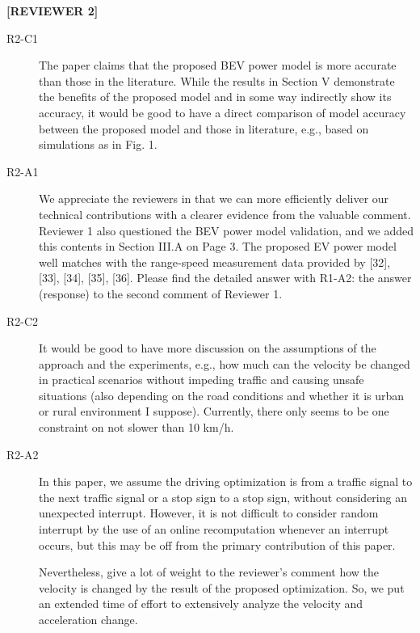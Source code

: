 \documentclass[onecolumn]{IEEEconf}
\begin{document}
\textbf{[REVIEWER 2]}
\begin{description}

\item [R2-C1] The paper claims that the proposed BEV power model is more accurate than those in the literature. While the results in Section V demonstrate the benefits of the proposed model and in some way indirectly show its accuracy, it would be good to have a direct comparison of model accuracy between the proposed model and those in literature, e.g., based on simulations as in Fig. 1. 

\item [R2-A1] We appreciate the reviewers in that we can more efficiently deliver our technical contributions with a clearer evidence from the valuable comment. Reviewer 1 also questioned the BEV power model validation, and we added this contents in Section III.A on Page 3. The proposed EV power model well matches with the range-speed measurement  data provided by [32], [33], [34], [35], [36]. Please find the detailed answer with R1-A2: the answer (response) to the second comment of Reviewer 1.

\item [R2-C2] It would be good to have more discussion on the assumptions of the approach and the experiments, e.g., how much can the velocity be changed in practical scenarios without impeding traffic and causing unsafe situations (also depending on the road conditions and whether it is urban or rural environment I suppose). Currently, there only seems to be one constraint on not slower than 10 km/h. 

\item [R2-A2] In this paper, we assume the driving optimization is from a traffic signal to the next traffic signal or a stop sign to a stop sign, without considering an unexpected interrupt. However, it is not difficult to consider random interrupt by the use of an online recomputation whenever an interrupt occurs, but this may be off from the primary contribution of this paper. 

Nevertheless, give a lot of weight to the reviewer’s comment how the velocity is changed by the result of the proposed optimization. So, we put an extended time of effort to extensively analyze the velocity and acceleration change.


\end{description}
\end{document}

